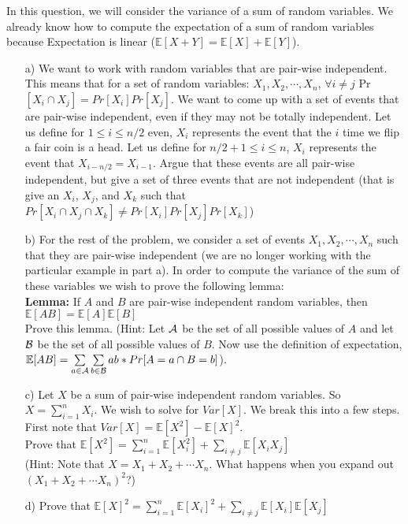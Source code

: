 \documentclass[]{article}
\def \exx {\mathbb{E}}
\begin{document}
\begin{qunlist}
In this question, we will consider the variance of a sum of random variables. We already know how to compute the expectation of a sum of random variables because Expectation is linear ($\mathbb{E}[X+Y] = \mathbb{E}[X] + \mathbb{E}[Y]$).
\begin{enumerate}
\qpart
\item[a)] We want to work with random variables that are pair-wise independent. This means that for a set of random variables: $X_1, X_2, \cdots, X_n$, $\forall{i \neq} j $ Pr$[X_i \cap X_j] = Pr[X_i]Pr[X_j]$. We want to come up with a set of events that are pair-wise independent, even if they may not be totally independent. Let us define for $1 \leq i \leq n/2$ even, $X_i$ represents the event that the $i$ time we flip a fair coin is a head. Let us define for $n/2 + 1 \leq i \leq n$, $X_i$ represents the event that $X_{i-n/2} = X_{i-1}$. Argue that these events are all pair-wise independent, but give a set of three events that are not independent (that is give an $X_i$, $X_j$, and $X_k$ such that $Pr[X_i \cap X_j \cap X_k] \neq Pr[X_i]Pr[X_j]Pr[X_k]$)
\qpart
\item[b)] For the rest of the problem, we consider a set of events $X_1, X_2, \cdots, X_n$ such that they are pair-wise independent (we are no longer working with the particular example in part a). In order to compute the variance of the sum of these variables we wish to prove the following lemma: \\ \textbf{Lemma:} If $A$ and $B$ are pair-wise independent random variables, then $\exx[AB] = \exx[A] \exx[B]$ \\ Prove this lemma. (Hint: Let ${\cal A}$ be the set of all possible values of $A$ and let ${\cal B}$ be the set of all possible values of $B$. Now use the definition of expectation, $\exx[AB] = \sum\limits_{a \in \Aset} \sum\limits_{b \in \Bset} ab*Pr[A=a \cap B = b]$).
\qpart
\item[c)] Let $X$ be a sum of pair-wise independent random variables. So $X = \sum\nolimits_{i=1}^n X_i$. We wish to solve for $Var[X]$. We break this into a few steps. First note that $Var[X] = \exx[X^2] - \exx[X]^2$. \\ Prove that $\exx[X^2] = \sum\nolimits_{i=1}^n \exx[X_i^2] + \sum\limits_{i \neq j} \exx[X_iX_j]$ \\ (Hint: Note that $X = X_1 + X_2 + \cdots X_n$. What happens when you expand out $(X_1 + X_2 + \cdots X_n)^2$?)
\qpart
\item[d)] Prove that $\exx[X]^2 = \sum\nolimits_{i=1}^n \exx[X_i]^2 + \sum\limits_{i \neq j} \exx[X_i] \exx[X_j]$

\end{enumerate}
\end{qunlist}
\end{document}
